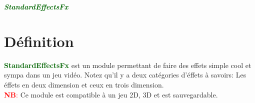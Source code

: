 \documentclass[a4paper, 11pt]{article}
\begin{document}
	\pagecolor{silver}
	\huge{\hspace{12.5cm}\textit{\textbf{\textcolor{darkgreen}{StandardEffectsFx}}}}\large{} 
	\tableofcontents \newpage
	\section{Définition}
	\textcolor{darkgreen}{\textbf{StandardEffectsFx}} est un module permettant de faire des effets simple 
	cool et sympa dans un jeu vidéo. Notez qu'il y a deux catégories d'éffets à savoirs: Les éffets en deux
	dimension et ceux en trois dimension.\\
	\textcolor{red}{\textbf{NB}:} Ce module est compatible à un jeu 2D, 3D et est sauvegardable.

\end{document}
